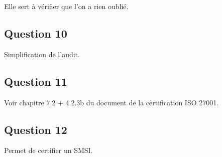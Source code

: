 \documentclass[11pt,a4paper]{article}
\begin{document}
	Elle sert à vérifier que l'on a rien oublié.
	
	\subsection{Question 10}
	
	Simplification de l'audit.
	
	\subsection{Question 11}
	
	Voir chapitre 7.2 + 4.2.3b du document de la certification ISO 27001.
	
	\subsection{Question 12}
	
	Permet de certifier un SMSI.
	
\end{document}
